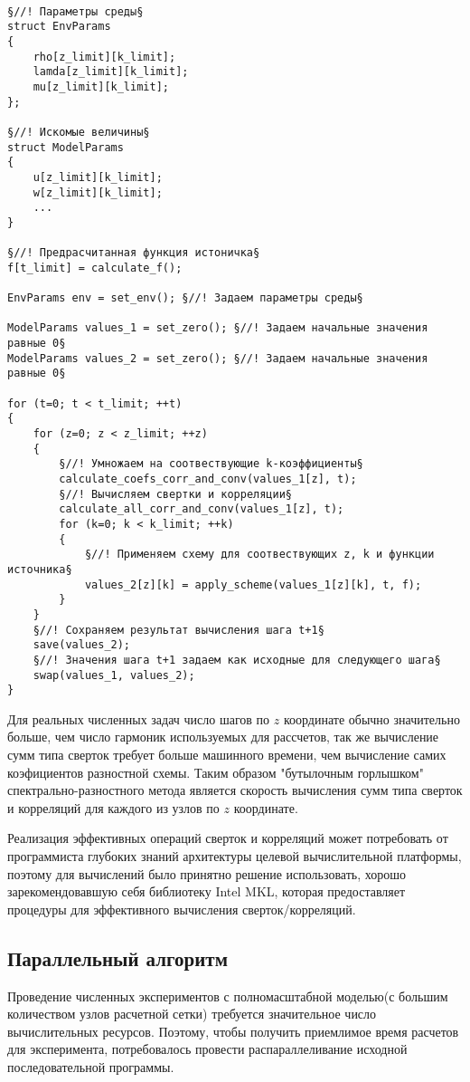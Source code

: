 \begin{lstlisting}[style={CppCodeStyle}]

§//! Параметры среды§
struct EnvParams
{
	rho[z_limit][k_limit];
	lamda[z_limit][k_limit];
	mu[z_limit][k_limit];
};

§//! Искомые величины§
struct ModelParams
{
	u[z_limit][k_limit];
	w[z_limit][k_limit];
	... 
}

§//! Предрасчитанная функция истоничка§
f[t_limit] = calculate_f();

EnvParams env = set_env(); §//! Задаем параметры среды§

ModelParams values_1 = set_zero(); §//! Задаем начальные значения равные 0§
ModelParams values_2 = set_zero(); §//! Задаем начальные значения равные 0§

for (t=0; t < t_limit; ++t)
{
	for (z=0; z < z_limit; ++z)
	{
		§//! Умножаем на соотвествующие k-коэффициенты§
		calculate_coefs_corr_and_conv(values_1[z], t);
		§//! Вычисляем свертки и корреляции§
		calculate_all_corr_and_conv(values_1[z], t);
		for (k=0; k < k_limit; ++k)
		{
			§//! Применяем схему для соотвествующих z, k и функции источника§
			values_2[z][k] = apply_scheme(values_1[z][k], t, f);
		}
	}
	§//! Сохраняем результат вычисления шага t+1§
	save(values_2);
	§//! Значения шага t+1 задаем как исходные для следующего шага§
	swap(values_1, values_2);
}

\end{lstlisting}

Для реальных численных задач число шагов по $z$ координате обычно значительно больше, чем число гармоник используемых для рассчетов,
так же вычисление сумм типа сверток требует больше машинного времени, чем вычисление самих коэфициентов разностной схемы.
Таким образом "бутылочным горлышком" спектрально-разностного метода является скорость вычисления сумм типа сверток и корреляций для
каждого из узлов по $z$ координате.

Реализация эффективных операций сверток и корреляций может потребовать от программиста глубоких знаний архитектуры 
целевой вычислительной платформы, поэтому для вычислений было принятно решение использовать,
хорошо зарекомендовавшую себя библиотеку Intel MKL, которая предоставляет процедуры для эффективного вычисления сверток/корреляций.

\subsection{Параллельный алгоритм}
Проведение численных экспериментов с полномасштабной моделью(с большим количеством узлов расчетной сетки)
требуется значительное число вычислительных ресурсов. Поэтому, чтобы получить приемлимое время расчетов для эксперимента,
потребовалось провести распараллеливание исходной последовательной программы.

